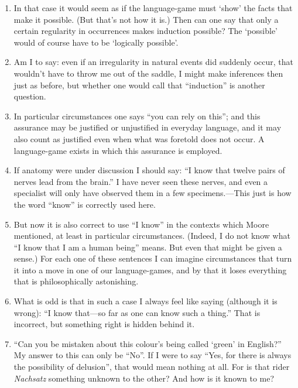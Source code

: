 \documentclass{book}
\begin{document}
\begin{enumerate}
\item
In that case it would seem as if the language-game must `show' the facts that
make it possible. (But that's not how it is.) Then can one say that only a
certain regularity in occurrences makes induction possible? The `possible'
would of course have to be `logically possible'.

\item
Am I to say: even if an irregularity in natural events did suddenly occur, that
wouldn't have to throw me out of the saddle, I might make inferences then just
as before, but whether one would call that ``induction'' is another question.

\item
In particular circumstances one says ``you can rely on this''; and this
assurance may be justified or unjustified in everyday language, and it may also
count as justified even when what was foretold does not occur. A language-game
exists in which this assurance is employed.

\item
If anatomy were under discussion I should say: ``I know that twelve pairs of
nerves lead from the brain.'' I have never seen these nerves, and even a
specialist will only have observed them in a few specimens.---This just is how
the word ``know'' is correctly used here.

\item
But now it is also correct to use ``I know'' in the contexts which Moore
mentioned, at least in particular circumstances. (Indeed, I do not know what
``I know that I am a human being'' means. But even that might be given a
sense.) For each one of these sentences I can imagine circumstances that turn
it into a move in one of our language-games, and by that it loses everything
that is philosophically astonishing.

\item
What is odd is that in such a case I always feel like saying (although it is
wrong): ``I know that---so far as one can know such a thing.'' That is
incorrect, but something right is hidden behind it.

\item
``Can you be mistaken about this colour's being called `green' in English?'' My
answer to this can only be ``No''. If I were to say ``Yes, for there is always
the possibility of delusion'', that would mean nothing at all.  For is that
rider \emph{Nachsatz} something unknown to the other? And how is it known to
me?


\end{enumerate}
\end{document}
